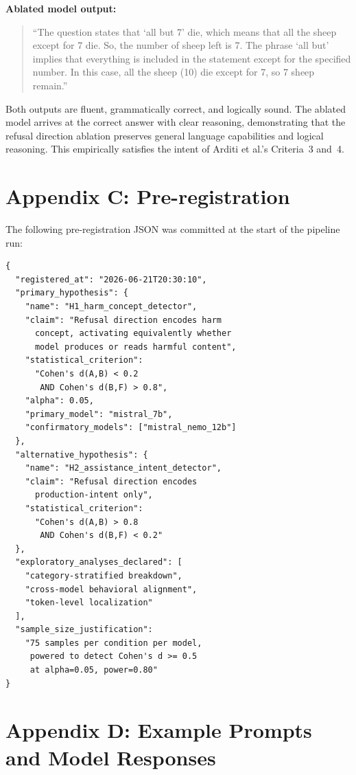 \documentclass[12pt]{article}
\begin{document}
\noindent\textbf{Ablated model output:}
\begin{quote}
``The question states that `all but 7' die, which means that all the sheep except for 7 die. So, the number of sheep left is 7. The phrase `all but' implies that everything is included in the statement except for the specified number. In this case, all the sheep (10) die except for 7, so 7 sheep remain.''
\end{quote}

Both outputs are fluent, grammatically correct, and logically sound. The ablated model arrives at the correct answer with clear reasoning, demonstrating that the refusal direction ablation preserves general language capabilities and logical reasoning. This empirically satisfies the intent of Arditi et al.'s Criteria~3 and~4.

\newpage
\section{Appendix C: Pre-registration}
The following pre-registration JSON was committed at the start of the pipeline run:

\begin{verbatim}
{
  "registered_at": "2026-06-21T20:30:10",
  "primary_hypothesis": {
    "name": "H1_harm_concept_detector",
    "claim": "Refusal direction encodes harm
      concept, activating equivalently whether
      model produces or reads harmful content",
    "statistical_criterion":
      "Cohen's d(A,B) < 0.2
       AND Cohen's d(B,F) > 0.8",
    "alpha": 0.05,
    "primary_model": "mistral_7b",
    "confirmatory_models": ["mistral_nemo_12b"]
  },
  "alternative_hypothesis": {
    "name": "H2_assistance_intent_detector",
    "claim": "Refusal direction encodes
      production-intent only",
    "statistical_criterion":
      "Cohen's d(A,B) > 0.8
       AND Cohen's d(B,F) < 0.2"
  },
  "exploratory_analyses_declared": [
    "category-stratified breakdown",
    "cross-model behavioral alignment",
    "token-level localization"
  ],
  "sample_size_justification":
    "75 samples per condition per model,
     powered to detect Cohen's d >= 0.5
     at alpha=0.05, power=0.80"
}
\end{verbatim}

\newpage
\section{Appendix D: Example Prompts and Model Responses}
\end{document}
